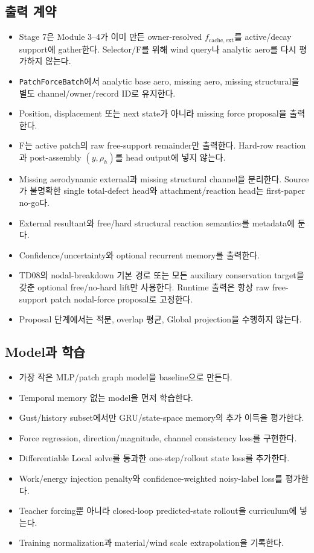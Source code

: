 \documentclass[10pt,a4paper]{article}
\newcommand{\todo}{\textcolor{TodoGray}{\(\square\)}}
\newcommand{\code}[1]{\texttt{#1}}
\begin{document}
\subsection*{출력 계약}

\begin{itemize}
  \item[\todo] Stage 7은 Module 3--4가 이미 만든 owner-resolved
  \(f_{\mathrm{cache,ext}}\)를 active/decay support에 gather한다.
  Selector/F를 위해 wind query나 analytic aero를 다시 평가하지 않는다.
  \item[\todo] \code{PatchForceBatch}에서 analytic base aero, missing aero, missing structural을 별도 channel/owner/record ID로 유지한다.
  \item[\todo] Position, displacement 또는 next state가 아니라 missing force proposal을 출력한다.
  \item[\todo] F는 active patch의 raw free-support remainder만 출력한다.
  Hard-row reaction과 post-assembly \((y,\rho_h)\)를 head output에 넣지 않는다.
  \item[\todo] Missing aerodynamic external과 missing structural channel을 분리한다.
  Source가 불명확한 single total-defect head와 attachment/reaction head는 first-paper no-go다.
  \item[\todo] External resultant와 free/hard structural reaction semantics를 metadata에 둔다.
  \item[\todo] Confidence/uncertainty와 optional recurrent memory를 출력한다.
  \item[\todo] TD08의 nodal-breakdown 기본 경로 또는 모든 auxiliary conservation target을 갖춘
  optional free/no-hard lift만 사용한다. Runtime 출력은 항상 raw free-support patch nodal-force proposal로 고정한다.
  \item[\todo] Proposal 단계에서는 적분, overlap 평균, Global projection을 수행하지 않는다.
\end{itemize}

\subsection*{Model과 학습}

\begin{itemize}
  \item[\todo] 가장 작은 MLP/patch graph model을 baseline으로 만든다.
  \item[\todo] Temporal memory 없는 model을 먼저 학습한다.
  \item[\todo] Gust/history subset에서만 GRU/state-space memory의 추가 이득을 평가한다.
  \item[\todo] Force regression, direction/magnitude, channel consistency loss를 구현한다.
  \item[\todo] Differentiable Local solve를 통과한 one-step/rollout state loss를 추가한다.
  \item[\todo] Work/energy injection penalty와 confidence-weighted noisy-label loss를 평가한다.
  \item[\todo] Teacher forcing뿐 아니라 closed-loop predicted-state rollout을 curriculum에 넣는다.
  \item[\todo] Training normalization과 material/wind scale extrapolation을 기록한다.
\end{itemize}
\end{document}
